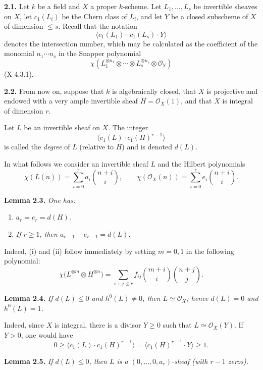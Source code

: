 \textbf{2.1.} Let \(k\) be a field and \(X\) a proper \(k\)-scheme. Let
\(L_1,\ldots,L_s\) be invertible sheaves on \(X\), let \(c_1(L_i)\) be the
Chern class of \(L_i\), and let \(Y\) be a closed subscheme of \(X\) of
dimension \(\le s\). Recall that the notation
\[
\bigl\langle c_1(L_1)\cdots c_1(L_s)\cdot Y\bigr\rangle
\]
denotes the intersection number, which may be calculated as the
coefficient of the monomial \(n_1\cdots n_s\) in the Snapper polynomial
\[
\chi\!\left(
L_1^{\otimes n_1}\otimes\cdots\otimes L_s^{\otimes n_s}
\otimes\mathcal O_Y
\right)
\]
(X 4.3.1).

\textbf{2.2.} From now on, suppose that \(k\) is algebraically closed,
that \(X\) is projective and endowed with a very ample invertible sheaf
\(H=\mathcal O_X(1)\), and that \(X\) is integral of dimension \(r\).

Let \(L\) be an invertible sheaf on \(X\). The integer
\[
\bigl\langle c_1(L)\cdot c_1(H)^{r-1}\bigr\rangle
\]
is called the \emph{degree} of \(L\) (relative to \(H\)) and is denoted
\(d(L)\).

In what follows we consider an invertible sheaf \(L\) and the Hilbert
polynomials
\[
\chi(L(n))=\sum_{i=0}^{r}a_i\binom{n+i}{i},
\qquad
\chi(\mathcal O_X(n))=\sum_{i=0}^{r}e_i\binom{n+i}{i}.
\]

\textbf{Lemma 2.3.} \emph{One has:}
\begin{enumerate}[label=(\roman*)]
\item \emph{\(a_r=e_r=d(H)\).}
\item \emph{If \(r\ge1\), then \(a_{r-1}-e_{r-1}=d(L)\).}
\end{enumerate}

Indeed, (i) and (ii) follow immediately by setting \(m=0,1\) in the
following polynomial:
\[
\chi\bigl(L^{\otimes m}\otimes H^{\otimes n}\bigr)
=\sum_{i+j\le r}f_{ij}
\binom{m+i}{i}\binom{n+j}{j}.
\]

\textbf{Lemma 2.4.} \emph{If \(d(L)\le0\) and \(h^0(L)\ne0\), then
\(L\simeq\mathcal O_X\); hence \(d(L)=0\) and \(h^0(L)=1\).}

Indeed, since \(X\) is integral, there is a divisor \(Y\ge0\) such that
\(L\simeq\mathcal O_X(Y)\). If \(Y>0\), one would have
\[
0\ge
\bigl\langle c_1(L)\cdot c_1(H)^{r-1}\bigr\rangle
=\bigl\langle c_1(H)^{r-1}\cdot Y\bigr\rangle
\ge1.
\]

\textbf{Lemma 2.5.} \emph{If \(d(L)\le0\), then \(L\) is a
\((0,\ldots,0,a_r)\)-sheaf (with \(r-1\) zeros).}

